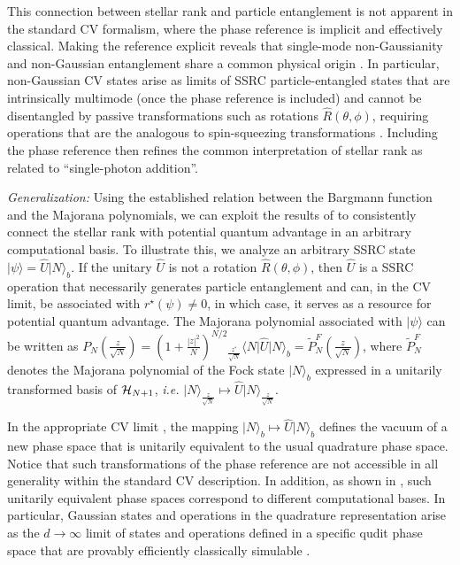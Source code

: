 \documentclass[aps,prl,showpacs,twocolumn]{revtex4-2}
\providecommand{\bra}[1]{\langle #1 \rvert}
\providecommand{\ket}[1]{\lvert #1 \rangle}
\providecommand{\bra}[1]{\langle #1 \rvert}
\providecommand{\ket}[1]{\lvert #1 \rangle}
\providecommand{\bra}[1]{\langle #1 \rvert}
\providecommand{\ket}[1]{\lvert #1 \rangle}
\providecommand{\bra}[1]{\langle #1 \rvert}
\providecommand{\ket}[1]{\lvert #1 \rangle}
\begin{document}
This connection between stellar rank and particle entanglement is not apparent in the standard CV formalism, where the phase reference is implicit and effectively classical. Making the reference explicit reveals that single-mode non-Gaussianity and non-Gaussian entanglement share a common physical origin \cite{MattiaX}. In particular, non-Gaussian CV states arise as limits of SSRC particle-entangled states that are intrinsically multimode (once the phase reference is included) and cannot be disentangled by passive transformations such as rotations $\hat R(\theta,\phi)$, requiring operations that are the analogous to spin-squeezing transformations \cite{PhysRevLett.86.4431, daltonNewSpinSqueezing2014a, daltonQuantumEntanglementSystems2017, PhysRevA.102.012412, PhysRevLett.132.153601}. Including the phase reference then refines the common interpretation of stellar rank as related to “single-photon addition”.




{\it Generalization:}  Using the established relation between the Bargmann function and the Majorana polynomials, we can exploit the results of \cite{descamps2025HW} to consistently connect the stellar rank with potential quantum advantage in an arbitrary computational basis. To illustrate this, we analyze an arbitrary SSRC state $\ket{\psi} = \hat U \ket{N}_b$. If the unitary $\hat U$ is not a rotation $\hat R(\theta, \phi)$, then $\hat U$ is a SSRC operation that necessarily generates particle entanglement \cite{PhysRevLett.132.153601, descamps2025unifiedframeworkbosonicquantum} and can, in the CV limit, be associated with $r^{\star}(\psi)\neq 0$, in which case, it serves as a resource for potential quantum advantage. The Majorana polynomial associated with $\ket{\psi}$ can be written as
$P_N\!\left(\frac{z}{\sqrt{N}}\right)
=\left(1+\frac{|z|^2}{N}\right)^{N/2}
{}_{\frac{z^*}{\sqrt{N}}}\!\bra{N}\hat U\ket{N}_b
= \tilde P_N^{F}\!\left(\frac{z}{\sqrt{N}}\right)$,
where $\tilde P_N^{F}$ denotes the Majorana polynomial of the Fock state $\ket{N}_b$ expressed in a unitarily transformed basis of ${\cal H}_{N+1}$, {\it i.e.} $\ket{N}_{\frac{z}{\sqrt{N}}} \mapsto \hat U \ket{N}_{\frac{z}{\sqrt{N}}}$.



In the appropriate CV limit \cite{descamps2025HW}, the mapping $\ket{N}_b \mapsto \hat U\ket{N}_b$ defines the vacuum of a new phase space that is unitarily equivalent to the usual quadrature phase space. Notice that such transformations of the phase reference are not accessible in all generality within the standard CV description. In addition, as shown in \cite{descamps2025HW}, such unitarily equivalent phase spaces correspond to different computational bases. In particular, Gaussian states and operations in the quadrature representation arise as the $d\to\infty$ limit of states and operations defined in a specific qudit phase space that are provably efficiently classically simulable \cite{Gross2006Hudsons,Veitch2014,VeitchEtAl2012,PhysRevA.73.012301, PhysRevA.71.042302}.
\end{document}
